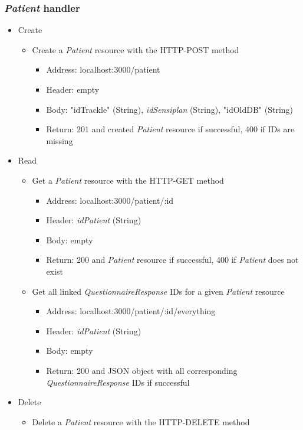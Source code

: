 \documentclass[
a4paper,
11pt
]{article}
\begin{document}
	\subsubsection*{\textit{Patient} handler}
	\begin{itemize}
		\item Create
		\begin{itemize}
			\item Create a \textit{Patient} resource with the \ac{HTTP}-POST method
			\begin{itemize}
				\item Address: localhost:3000/patient
				\item Header: empty
				\item Body: "idTrackle" (String), \textit{idSensiplan} (String), "idOldDB" (String)
				\item Return: 201 and created \textit{Patient} resource if successful, 400 if IDs are missing
			\end{itemize}
		\end{itemize}
		\item Read
		\begin{itemize}
			\item Get a \textit{Patient} resource with the \ac{HTTP}-GET method
			\begin{itemize}
				\item Address: localhost:3000/patient/:id
				\item Header: \textit{idPatient} (String)
				\item Body: empty
				\item Return: 200 and \textit{Patient} resource if successful, 400 if \textit{Patient} does not exist
			\end{itemize}
			\item Get all linked \textit{QuestionnaireResponse} IDs for a given \textit{Patient} resource
			\begin{itemize}
				\item Address: localhost:3000/patient/:id/everything
				\item Header: \textit{idPatient} (String)
				\item Body: empty
				\item Return: 200 and \ac{JSON} object with all corresponding \textit{QuestionnaireResponse} IDs  if successful
			\end{itemize}
		\end{itemize}
		\item Delete
		\begin{itemize}
			\item Delete a \textit{Patient} resource with the \ac{HTTP}-DELETE method
			\begin{itemize}
				

\end{itemize}
\end{itemize}
\end{itemize}
\end{document}
